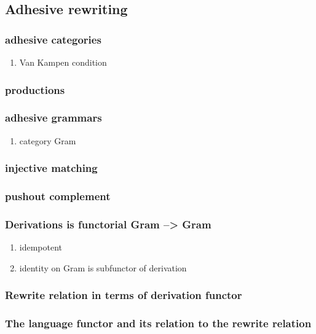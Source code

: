 \documentclass{amsart}
\theoremstyle{remark}
\theoremstyle{definition}
\begin{document}
{{%

\subsection{Adhesive rewriting}
\label{sec-3-3}

\subsubsection{adhesive categories}
\label{sec-3-3-1}
\begin{enumerate}
\item Van Kampen condition
\label{sec-3-3-1-1}
\end{enumerate}
\subsubsection{productions}
\label{sec-3-3-2}
\subsubsection{adhesive grammars}
\label{sec-3-3-3}
\begin{enumerate}
\item category Gram
\label{sec-3-3-3-1}
\end{enumerate}
\subsubsection{injective matching}
\label{sec-3-3-4}
\subsubsection{pushout complement}
\label{sec-3-3-5}
\subsubsection{Derivations is functorial Gram --> Gram}
\label{sec-3-3-6}
\begin{enumerate}
\item idempotent
\label{sec-3-3-6-1}
\item identity on Gram is subfunctor of derivation
\label{sec-3-3-6-2}
\end{enumerate}
\subsubsection{Rewrite relation in terms of derivation functor}
\label{sec-3-3-7}
\subsubsection{The language functor and its relation to the rewrite relation}
\label{sec-3-3-8}

}}
\end{document}
